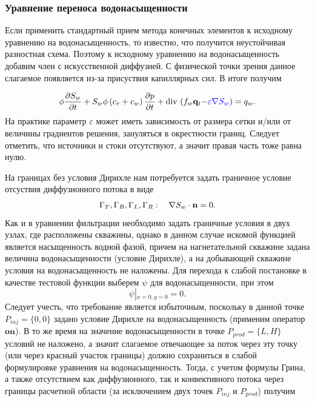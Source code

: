 \subsubsection{Уравнение переноса водонасыщенности}

Если применить стандартный прием метода конечных элементов к исходному уравнению на водонасыщенность, то известно, 
что получится неустойчивая разностная схема. 
Поэтому к исходному уравнению на водонасыщенность добавим член с искусственной диффузией. 
С физической точки зрения данное слагаемое появляется из-за присуствия капиллярных сил. В итоге получим 

\begin{equation}\label{eq:satur_diffusion}
	\phi \dfrac{\partial S_w}{\partial t} + S_w\phi\left(c_r + c_w \right)\dfrac{\partial p}{\partial t} + \operatorname{div}\, \left( f_w \mathbf{q}_t {- \color{blue}\varepsilon \nabla S_w} \right) = 
	q_w.
\end{equation}
На практике параметр $\varepsilon$ может иметь зависимость от размера сетки и/или от 
величины градиентов решения, зануляться в окрестности границ. Следует отметить, что источники и стоки
отсутствуют, а значит правая часть  тоже равна нулю.

На границах без условия Дирихле нам потребуется задать граничное условие отсуствия диффузионного потока в виде
\begin{equation}\label{eq:GammaTBLR_Sw_diffusion}
	\Gamma_T, \Gamma_B, \Gamma_L, \Gamma_R: \quad \nabla S_w \cdot \mathbf{n} = 0.
\end{equation}
Как и в уравнении фильтрации необходимо задать граничные условия в двух узлах, где расположены скважины,
однако в данном случае искомой функцией является насыщенность водной фазой, причем на нагнетательной скважине
задана величина водонасыщенности (условие Дирихле), а на добывающей скважине условия на водонасыщенность не наложены.
Для перехода к слабой постановке в качестве тестовой функции выберем $\psi$ для водонасыщенности, при этом 
\begin{equation}\label{eq:psi_equal_zero}
	\psi\left|_{x=0, y=0}\right. = 0.
\end{equation}
Следует учесть, что требование  является избыточным, поскольку в данной 
точке $P_{inj}=\{0,0\}$ задано условие Дирихле на водонасыщенность (применим оператор $\mathbf{on}$). В то же время на значение водонасыщенности в точке
$P_{prod}=\{L,H\}$ условий не наложено, а значит слагаемое отвечающее за поток через эту точку
(или через красный участок границы) должно сохраниться в слабой формулировке уравнения на водонасыщенность.
Тогда, с учетом формулы Грина, а также отсутствием как диффузионного, так и конвективного потока через границы
расчетной области (за исключением двух точек $P_{inj}$ и $P_{prod}$) получим

